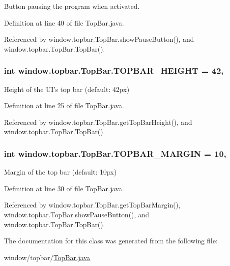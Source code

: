 Button pausing the program when activated. 



Definition at line 40 of file Top\-Bar.\-java.



Referenced by window.\-topbar.\-Top\-Bar.\-show\-Pause\-Button(), and window.\-topbar.\-Top\-Bar.\-Top\-Bar().

\hypertarget{a00031_aa7100cb3da5276c12e4fae659823bf4e}{
\subsubsection[{T\-O\-P\-B\-A\-R\-\_\-\-H\-E\-I\-G\-H\-T}]{\setlength{\rightskip}{0pt plus 5cm}int window.\-topbar.\-Top\-Bar.\-T\-O\-P\-B\-A\-R\-\_\-\-H\-E\-I\-G\-H\-T = 42\hspace{0.3cm}{\ttfamily [static]}, {\ttfamily [protected]}}}\label{a00031_aa7100cb3da5276c12e4fae659823bf4e}


Height of the U\-I's top bar (default\-: 42px) 



Definition at line 25 of file Top\-Bar.\-java.



Referenced by window.\-topbar.\-Top\-Bar.\-get\-Top\-Bar\-Height(), and window.\-topbar.\-Top\-Bar.\-Top\-Bar().

\hypertarget{a00031_a8d48486507d36a825223a21b1b6333ac}{
\subsubsection[{T\-O\-P\-B\-A\-R\-\_\-\-M\-A\-R\-G\-I\-N}]{\setlength{\rightskip}{0pt plus 5cm}int window.\-topbar.\-Top\-Bar.\-T\-O\-P\-B\-A\-R\-\_\-\-M\-A\-R\-G\-I\-N = 10\hspace{0.3cm}{\ttfamily [static]}, {\ttfamily [protected]}}}\label{a00031_a8d48486507d36a825223a21b1b6333ac}


Margin of the top bar (default\-: 10px) 



Definition at line 30 of file Top\-Bar.\-java.



Referenced by window.\-topbar.\-Top\-Bar.\-get\-Top\-Bar\-Margin(), window.\-topbar.\-Top\-Bar.\-show\-Pause\-Button(), and window.\-topbar.\-Top\-Bar.\-Top\-Bar().



The documentation for this class was generated from the following file\-:\begin{DoxyCompactItemize}
\item 
window/topbar/\hyperlink{a00054}{Top\-Bar.\-java}\end{DoxyCompactItemize}
